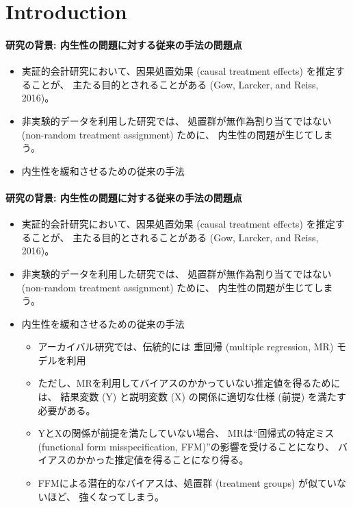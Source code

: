 \section{Introduction}

\paragraph{研究の背景: 内生性の問題に対する従来の手法の問題点}
\begin{itemize}
 \item 実証的会計研究において、因果処置効果 (causal treatment effects) を推定することが、
       主たる目的とされることがある (Gow, Larcker, and Reiss, 2016)。
 \item 非実験的データを利用した研究では、
       処置群が無作為割り当てではない (non-random treatment assignment) ために、
       内生性の問題が生じてしまう。
 \item 内生性を緩和させるための従来の手法
\end{itemize}

\paragraph{研究の背景: 内生性の問題に対する従来の手法の問題点}
\begin{itemize}
 \item 実証的会計研究において、因果処置効果 (causal treatment effects) を推定することが、
       主たる目的とされることがある (Gow, Larcker, and Reiss, 2016)。
 \item 非実験的データを利用した研究では、
       処置群が無作為割り当てではない (non-random treatment assignment) ために、
       内生性の問題が生じてしまう。
 \item 内生性を緩和させるための従来の手法
       \begin{itemize}
        \item アーカイバル研究では、伝統的には
              重回帰 (multiple regression, MR) モデルを利用
        \item ただし、MRを利用してバイアスのかかっていない推定値を得るためには、
              結果変数 (Y) と説明変数 (X) の関係に適切な仕様 (前提) を満たす必要がある。
        \item YとXの関係が前提を満たしていない場合、
              MRは``回帰式の特定ミス (functional form misspecification, FFM)''の影響を受けることになり、
              バイアスのかかった推定値を得ることになり得る。
        \item FFMによる潜在的なバイアスは、処置群 (treatment groups) が似ていないほど、
              強くなってしまう。
       \end{itemize}
\end{itemize}

